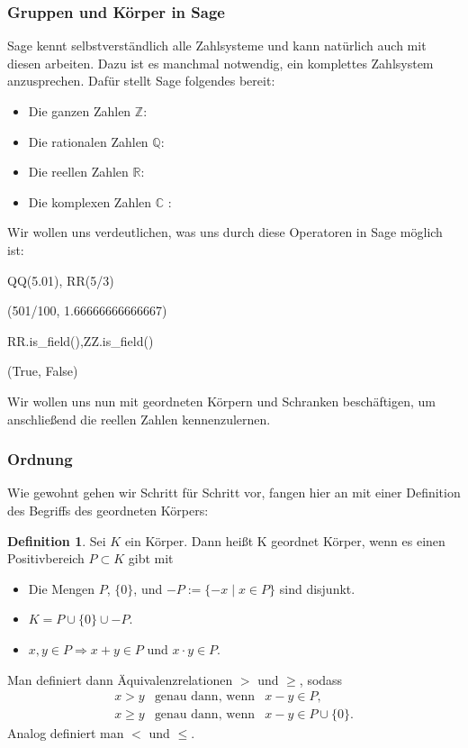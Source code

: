 \documentclass[fontsize=12pt,paper=a4,twoside,bibtotoc,idxtotoc,
liststotoc,pagesize,BCOR1.2cm,DIV15,chapterprefix,pagesize=pdftex]{scrbook}
\theoremstyle{plain}
\theoremstyle{definition}
\newtheorem{df}[equation]{Definition}
\theoremstyle{remark}
\begin{document}
\subsubsection{Gruppen und Körper in Sage}
Sage kennt selbstverständlich alle Zahlsysteme und kann natürlich auch mit diesen arbeiten. Dazu ist es manchmal notwendig, ein komplettes Zahlsystem
anzusprechen. Dafür stellt Sage folgendes bereit:
\begin{itemize}
\item Die ganzen Zahlen  $\mathbb{Z}$: 
\item Die rationalen Zahlen $\mathbb{Q}$:  
\item Die reellen Zahlen $\mathbb{R}$:  
\item Die komplexen Zahlen $\mathbb{C}$ : 
\end{itemize}
Wir wollen uns verdeutlichen, was uns durch diese Operatoren in Sage möglich ist:
\begin{sagein}
QQ(5.01), RR(5/3) 
\end{sagein}
\begin{sage}
(501/100, 1.66666666666667)
\end{sage}
\begin{sagein}
RR.is_field(),ZZ.is_field()
\end{sagein}
\begin{sage}
(True, False)
\end{sage}
Wir wollen uns nun mit geordneten Körpern und Schranken beschäftigen, um anschließend die reellen Zahlen kennenzulernen.
\subsubsection{Ordnung}
Wie gewohnt gehen wir Schritt für Schritt vor, fangen hier an mit einer Definition des Begriffs des geordneten Körpers:
\begin{df}
Sei $K$ ein Körper. Dann heißt K geordnet Körper, wenn es einen 
Positivbereich $P \subset K$ gibt mit
\begin{itemize}
 \item Die Mengen $P$, $\{ 0 \}$, und $-P:=\{-x\;|\;x \in P \}$ sind
disjunkt. 
 \item $K = P \cup \{ 0 \} \cup -P$.
 \item $x,y \in P\Rightarrow x+y \in P$ und $x \cdot y \in P$. 
\end{itemize}
\end{df}
Man definiert dann Äquivalenzrelationen $>$ und $\geq$, sodass
\begin{eqnarray*}
 x >y& \text{genau dann, wenn}& x-y\in P,\\
 x \geq y&  \text{genau dann, wenn} &x-y \in P \cup \{ 0 \}.
\end{eqnarray*}
Analog definiert man $<$ und $\leq$. 
\end{document}
